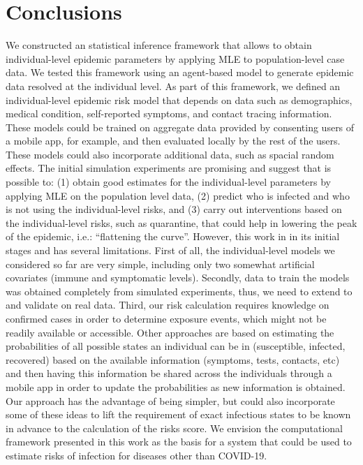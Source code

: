 \documentclass{article}
\begin{document}
\section{Conclusions}

We constructed an statistical inference framework that allows to obtain individual-level epidemic parameters by applying MLE to population-level case data. We tested this framework using an agent-based model to generate epidemic data resolved at the individual level. As part of this framework, we defined an individual-level epidemic risk model that depends on data such as demographics, medical condition, self-reported symptoms, and contact tracing information. These models could be trained on aggregate data provided by consenting users of a mobile app, for example, and then evaluated locally by the rest of the users. These models could also incorporate additional data, such as spacial random effects. The initial simulation experiments are promising and suggest that is possible to: (1) obtain good estimates for the individual-level parameters by applying MLE on the population level data, (2)  predict who is infected and who is not using the individual-level risks, and (3) carry out interventions based on the individual-level risks, such as quarantine, that could help in lowering the peak of the epidemic, i.e.: “flattening the curve”. However, this work in in its initial stages and has several limitations. First of all, the individual-level models we considered so far are very simple, including only two somewhat artificial covariates (immune and symptomatic levels). Secondly, data to train the models was obtained completely from simulated experiments, thus, we need to extend to and validate on real data. Third, our risk calculation requires knowledge on confirmed cases in order to determine exposure events, which might not be readily available or accessible. Other approaches \cite{sphinxteam, Alsdurf2020} are based on estimating the probabilities of all possible states an individual can be in (susceptible, infected, recovered) based on the available information (symptoms, tests, contacts, etc) and then having this information be shared across the individuals through a mobile app in order to update the probabilities as new information is obtained. Our approach has the advantage of being simpler, but could also incorporate some of these ideas to lift the requirement of exact infectious states to be known in advance to the calculation of the risks score. We envision the computational framework presented in this work as the basis for a system that could be used to estimate risks of infection for diseases other than COVID-19.
\end{document}

